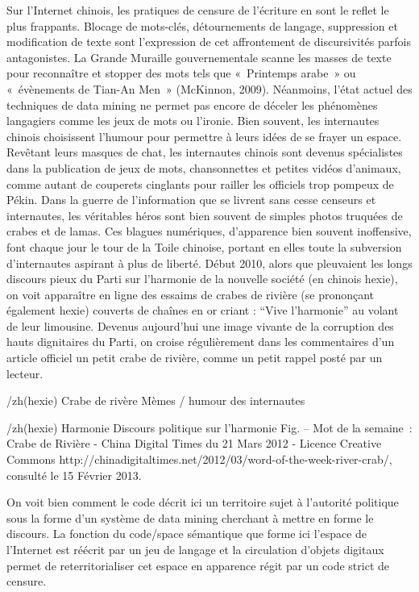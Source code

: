 Sur l’Internet chinois, les pratiques de censure de l’écriture en sont le reflet le plus frappants. Blocage de mots-clés, détournements de langage, suppression et modification de texte sont l’expression de cet affrontement de discursivités parfois antagonistes. La Grande Muraille gouvernementale scanne les masses de texte pour reconnaître et stopper des mots tels que « Printemps arabe » ou « évènements de Tian-An Men » (McKinnon, 2009). Néanmoins, l’état actuel des techniques de data mining ne permet pas encore de déceler les phénomènes langagiers comme les jeux de mots ou l’ironie. Bien souvent, les internautes chinois choisissent l’humour pour permettre à leurs idées de se frayer un espace. Revêtant leurs masques de chat, les internautes chinois sont devenus spécialistes dans la publication de jeux de mots, chansonnettes et petites vidéos d’animaux, comme autant de couperets cinglants pour railler les officiels trop pompeux de Pékin. Dans la guerre de l’information que se livrent sans cesse censeurs et internautes, les véritables héros sont bien souvent de simples photos truquées de crabes et de lamas. Ces blagues numériques, d’apparence bien souvent inoffensive, font chaque jour le tour de la Toile chinoise, portant en elles toute la subversion d’internautes aspirant à plus de liberté. Début 2010, alors que pleuvaient les longs discours pieux du Parti sur l’harmonie de la nouvelle société (en chinois hexie), on voit apparaître en ligne des essaims de crabes de rivière (se prononçant également hexie) couverts de chaînes en or criant : “Vive l’harmonie” au volant de leur limousine. Devenus aujourd’hui une image vivante de la corruption des hauts dignitaires du Parti, on croise régulièrement dans les commentaires d’un article officiel un petit crabe de rivière, comme un petit rappel posté par un lecteur.




/zh{}(hexie)
Crabe de rivère
Mèmes / humour des internautes

/zh{}(hexie)
Harmonie
Discours politique sur l’harmonie
Fig. – Mot de la semaine : Crabe de Rivière - China Digital Times du 21 Mars 2012 - Licence Creative Commons http://chinadigitaltimes.net/2012/03/word-of-the-week-river-crab/, consulté le 15 Février 2013.

On voit bien comment le code décrit ici un territoire sujet à l’autorité politique sous la forme d’un système de data mining cherchant à mettre en forme le discours. La fonction du code/space sémantique que forme ici l’espace de l’Internet est réécrit par un jeu de langage et la circulation d’objets digitaux permet de reterritorialiser cet espace en apparence régit par un code strict de censure. 


